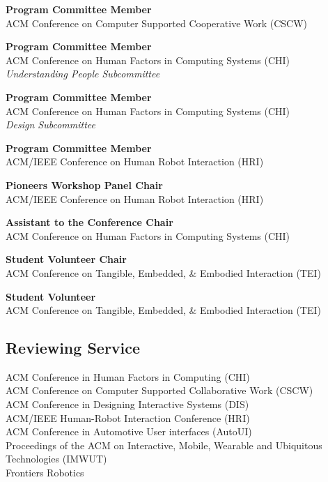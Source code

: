 \documentclass[11pt]{article} %
\begin{document}
 \textbf{Program Committee Member }\\
ACM Conference on Computer Supported Cooperative Work (CSCW)
\medskip

 \textbf{Program Committee Member}\\
ACM Conference on Human Factors in Computing Systems (CHI)\\ 
\textit{Understanding People Subcommittee }
\medskip

 \textbf{Program Committee Member}\\
ACM Conference on Human Factors in Computing Systems (CHI)\\
\textit{Design Subcommittee }
\medskip

 \textbf{Program Committee Member}\\
ACM/IEEE Conference on Human Robot Interaction (HRI)
\medskip

 \textbf{Pioneers Workshop Panel Chair}\\
ACM/IEEE Conference on Human Robot Interaction (HRI)
\medskip

 \textbf{Assistant to the Conference Chair}\\
ACM Conference on Human Factors in Computing Systems (CHI)\\
\medskip

 \textbf{Student Volunteer Chair}\\
ACM Conference on Tangible, Embedded, \& Embodied Interaction (TEI)\\
\medskip

 \textbf{Student Volunteer}\\
ACM Conference on Tangible, Embedded, \& Embodied Interaction (TEI)\\
\medskip

\subsection*{Reviewing Service}
ACM Conference in Human Factors in Computing (CHI)\\
ACM Conference on Computer Supported Collaborative Work (CSCW)\\
ACM Conference in Designing Interactive Systems (DIS)\\
ACM/IEEE Human-Robot Interaction Conference (HRI)\\
ACM Conference in Automotive User interfaces (AutoUI)\\
Proceedings of the ACM on Interactive, Mobile, Wearable and Ubiquitous Technologies (IMWUT)\\
Frontiers Robotics\\
\end{document}
